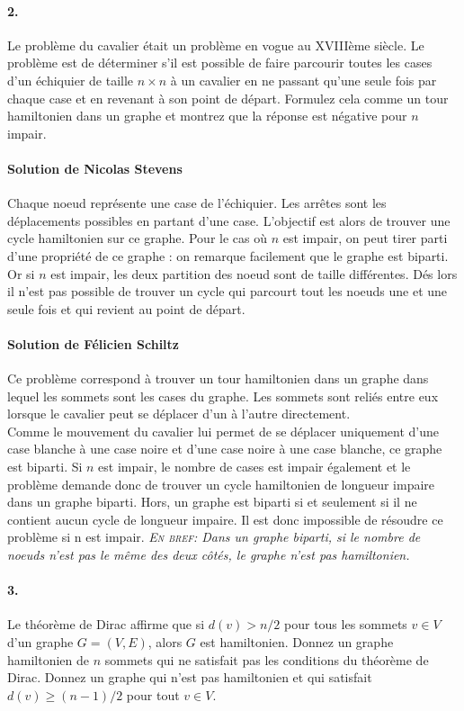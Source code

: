 \paragraph{2. } Le problème du cavalier était un problème en vogue au XVIIIème siècle. Le problème est de déterminer s'il est possible de faire parcourir toutes les cases d'un échiquier de taille $n \times n$ à un cavalier en ne passant qu'une seule fois par chaque case et en revenant à son point de départ. Formulez cela comme un tour hamiltonien dans un graphe et montrez que la réponse est négative pour $n$ impair.
\begin{solution}
\paragraph{Solution de Nicolas Stevens}
Chaque noeud représente une case de l'échiquier. Les arrêtes sont les déplacements possibles en partant d'une case. L'objectif est alors de trouver une cycle hamiltonien sur ce graphe. Pour le cas où $n$ est impair, on peut tirer parti d'une propriété de ce graphe : on remarque facilement que le graphe est biparti. Or si $n$ est impair, les deux partition des noeud sont de taille différentes. Dés lors il n'est pas possible de trouver un cycle qui parcourt tout les noeuds une et une seule fois et qui revient au point de départ.

\paragraph{Solution de Félicien Schiltz}
Ce problème correspond à trouver un tour hamiltonien dans un graphe dans lequel les sommets sont les cases du graphe. Les sommets sont reliés entre eux lorsque le cavalier peut se déplacer d'un à l'autre directement.\\
Comme le mouvement du cavalier lui permet de se déplacer uniquement d'une case blanche à une case noire et d'une case noire à une case blanche, ce graphe est biparti.
Si $n$ est impair, le nombre de cases est impair également et le problème demande donc de trouver un cycle hamiltonien de longueur impaire dans un graphe biparti. Hors, un graphe est biparti si et seulement si il ne contient aucun cycle de longueur impaire. Il est donc impossible de résoudre ce problème si n est impair.
\textit{\textsc{En bref: }Dans un graphe biparti, si le nombre de noeuds n'est pas le même des deux côtés, le graphe n'est pas hamiltonien.}
\end{solution}

\paragraph{3. } Le théorème de Dirac affirme que si $d(v) > n/2$ pour tous les sommets $v \in V$ d'un graphe $G=(V,E)$, alors $G$ est hamiltonien. Donnez un graphe hamiltonien de $n$ sommets qui ne satisfait pas les conditions du théorème de Dirac. Donnez un graphe qui n'est pas hamiltonien et qui satisfait $d(v) \geq (n-1)/2$ pour tout $v \in V$.

